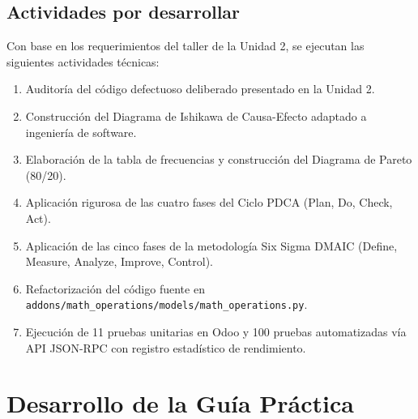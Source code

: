 \documentclass{article}
\begin{document}
\subsection{Actividades por desarrollar}
Con base en los requerimientos del taller de la Unidad 2, se ejecutan las siguientes actividades técnicas:
\begin{enumerate}
    \item Auditoría del código defectuoso deliberado presentado en la Unidad 2.
    \item Construcción del Diagrama de Ishikawa de Causa-Efecto adaptado a ingeniería de software.
    \item Elaboración de la tabla de frecuencias y construcción del Diagrama de Pareto (80/20).
    \item Aplicación rigurosa de las cuatro fases del Ciclo PDCA (Plan, Do, Check, Act).
    \item Aplicación de las cinco fases de la metodología Six Sigma DMAIC (Define, Measure, Analyze, Improve, Control).
    \item Refactorización del código fuente en \texttt{addons/math\_operations/models/math\_operations.py}.
    \item Ejecución de 11 pruebas unitarias en Odoo y 100 pruebas automatizadas vía API JSON-RPC con registro estadístico de rendimiento.
\end{enumerate}

\newpage

\section{Desarrollo de la Guía Práctica}
\end{document}
